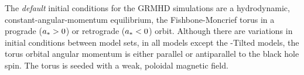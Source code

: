 The \emph{default} initial conditions for the GRMHD simulations are a hydrodynamic, constant-angular-momentum equilibrium, the Fishbone-Moncrief torus \citep{1976ApJ...207..962F}
in a prograde ($a_* > 0$) or retrograde ($a_* < 0$) orbit.  Although there are variations in initial conditions between model sets, in all models except the \hamr-Tilted models, the torus orbital angular momentum is either parallel or antiparallel to the black hole spin. %
The torus is seeded with a weak, poloidal magnetic field.

